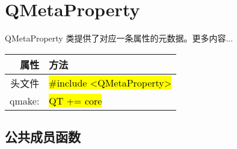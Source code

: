 \chapter{QMetaProperty}

QMetaProperty 类提供了对应一条属性的元数据。更多内容...

\begin{tabular}{|r|l|}
	\hline
	属性 & 方法 \\
	\hline
    头文件  &	\hl{\#include <QMetaProperty>} \\
    \hline
    qmake: & \hl{QT += core}    \\
	\hline
\end{tabular}

\section{公共成员函数}

